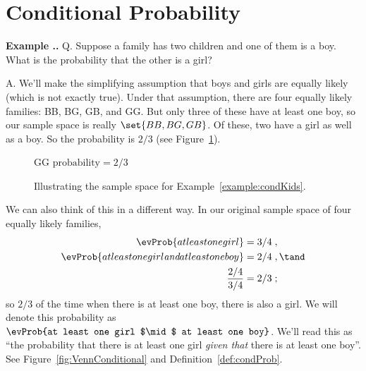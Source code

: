 \documentclass[twoside]{book}\usepackage[]{graphicx}\usepackage[]{xcolor}
\def\question{{\sf Q. }}
\def\answer{{\sf A. }}
\newcounter{example}[section]
\newenvironment{example}%
{\refstepcounter{example}%
\textbf{Example \thesection.\arabic{example}. }}%
{}
\begin{document}
\newpage

\section{Conditional Probability}


\begin{example}
\label{condKids}%
\label{example:condKids}%
  \question
  Suppose a family has two children and one of them is a boy.
  What is the probability that the other is a girl?

  \answer
  We'll make the simplifying assumption that boys and girls are 
  equally likely (which is not exactly true).  Under that assumption,
  there are four equally likely families:  BB, BG, GB, and GG.  But only three
  of these have at least one boy, so our sample space is really
  $\set{ BB, BG, GB}$.
  Of these, two have a girl as well as a boy.
  So the probability is $2/3$ (see Figure~\ref{fig:condKids}).  

\begin{figure}[h]
	\begin{center}
	  GG \qquad {}  
	\qquad \qquad $\mbox{probability}=2/3$
  \end{center}
\caption{Illustrating the sample space for Example~\ref{example:condKids}.}
\label{fig:condKids}%
\end{figure}

  We can also think of this in a different way.   In our original sample space
  of four equally likely families,
  \begin{align*}
	\evProb{at least one girl} & =  3/4 \; , \\ %
	\evProb{at least one girl \emph{and} at least one boy} & =  2/4 \; , \tand\\
	\frac{2/4}{3/4} & =  2/3 \; ;
  \end{align*}
  so $2/3$ of the time when there is at least one boy, there is also a girl.
  We will denote this probability as 
  $\evProb{at least one girl $\mid$ at least one boy}$.
  We'll read this as ``the probability that there is at least one girl \emph{given that} 
  there is at least one boy''.  
  See Figure~\ref{fig:VennConditional} and Definition~\ref{def:condProb}.
\end{example}
\end{document}
